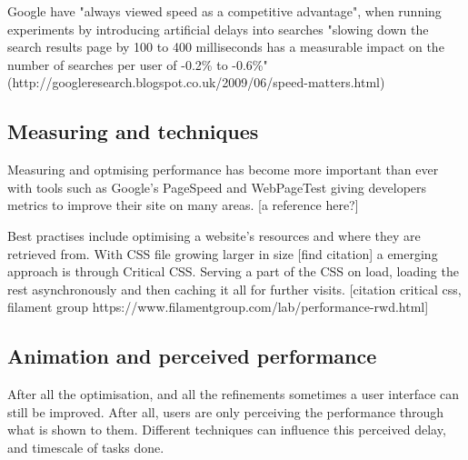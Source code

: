 Google have "always viewed speed as a competitive advantage", when running experiments by introducing artificial delays into searches "slowing down the search results page by 100 to 400 milliseconds has a measurable impact on the number of searches per user of -0.2\% to -0.6\%" (http://googleresearch.blogspot.co.uk/2009/06/speed-matters.html)

\subsection{Measuring and techniques}

Measuring and optmising performance has become more important than ever with tools such as Google's PageSpeed and WebPageTest giving developers metrics to improve their site on many areas. [a reference here?]

Best practises include optimising a website's resources and where they are retrieved from. With CSS file growing larger in size [find citation] a emerging approach is through Critical CSS. Serving a part of the CSS on load, loading the rest asynchronously and then caching it all for further visits. [citation critical css, filament group https://www.filamentgroup.com/lab/performance-rwd.html]




\subsection{Animation and perceived performance}


After all the optimisation, and all the refinements sometimes a user interface can still be improved. After all, users are only perceiving the performance through what is shown to them. Different techniques can influence this perceived delay, and timescale of tasks done.

